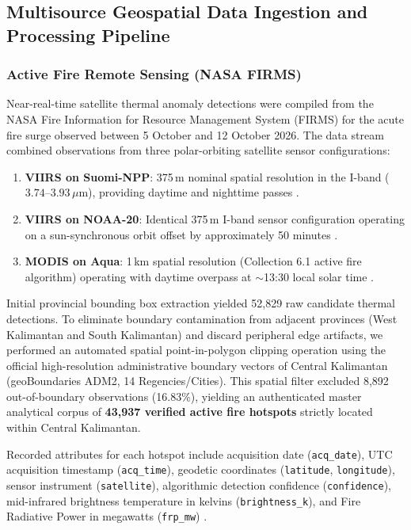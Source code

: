 \subsection{Multisource Geospatial Data Ingestion and Processing Pipeline}
\label{subsec:data_pipeline}

\subsubsection{Active Fire Remote Sensing (NASA FIRMS)}
\label{subsubsec:firms_data}

Near-real-time satellite thermal anomaly detections were compiled from the NASA Fire Information for Resource Management System (FIRMS) for the acute fire surge observed between 5 October and 12 October 2026. The data stream combined observations from three polar-orbiting satellite sensor configurations:
\begin{enumerate}
    \item \textbf{VIIRS on Suomi-NPP}: 375\,m nominal spatial resolution in the I-band ($3.74$--$3.93\,\mu\text{m}$), providing daytime and nighttime passes \citep{Schroeder2021RSE, Roberts2020RS}.
    \item \textbf{VIIRS on NOAA-20}: Identical 375\,m I-band sensor configuration operating on a sun-synchronous orbit offset by approximately 50 minutes \citep{Schroeder2021RSE}.
    \item \textbf{MODIS on Aqua}: 1\,km spatial resolution (Collection 6.1 active fire algorithm) operating with daytime overpass at $\sim$13:30 local solar time \citep{Giglio2020RSE}.
\end{enumerate}

Initial provincial bounding box extraction yielded 52,829 raw candidate thermal detections. To eliminate boundary contamination from adjacent provinces (West Kalimantan and South Kalimantan) and discard peripheral edge artifacts, we performed an automated spatial point-in-polygon clipping operation using the official high-resolution administrative boundary vectors of Central Kalimantan (geoBoundaries ADM2, 14 Regencies/Cities). This spatial filter excluded 8,892 out-of-boundary observations (16.83\%), yielding an authenticated master analytical corpus of \textbf{43,937 verified active fire hotspots} strictly located within Central Kalimantan.

Recorded attributes for each hotspot include acquisition date (\texttt{acq\_date}), UTC acquisition timestamp (\texttt{acq\_time}), geodetic coordinates (\texttt{latitude}, \texttt{longitude}), sensor instrument (\texttt{satellite}), algorithmic detection confidence (\texttt{confidence}), mid-infrared brightness temperature in kelvins (\texttt{brightness\_k}), and Fire Radiative Power in megawatts (\texttt{frp\_mw}) \citep{Roberts2015RSE, Chuvieco2019ESSD}.

